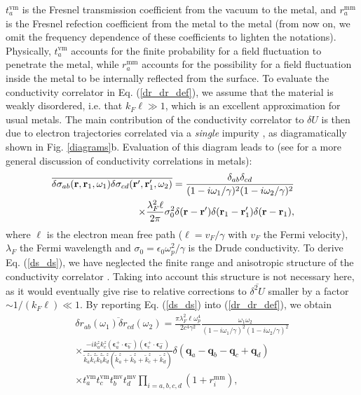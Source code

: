 \documentclass[doublecol]{epl2}
\newcommand{\bs}[1]{{\boldsymbol{#1}}}
\newcommand{\bq}{\bs{q}}
\newcommand{\be}{\bs{\epsilon}}
\begin{document}
$t_a^\text{vm}$ is the Fresnel transmission coefficient from the vacuum to the metal, and $r_a^\text{mm}$ is the Fresnel refection coefficient from the metal to the metal (from now on, we omit the frequency dependence of these coefficients to lighten the notations). Physically, $t_a^\text{vm}$ accounts for the finite probability for a field fluctuation to penetrate the metal, while $r_a^\text{mm}$ accounts for the possibility for a field fluctuation inside the metal to be internally reflected from the surface. 
To evaluate  the conductivity correlator in Eq. (\ref{dr_dr_def}), we assume that the material is weakly disordered, i.e. that $k_F\ell\gg 1$, which is an excellent approximation for usual metals. The main contribution of the conductivity correlator to $\delta U$ is then due to electron trajectories correlated via a \textit{single} impurity \cite{Cherroret15}, as diagramatically shown in Fig. \ref{diagrams}b. Evaluation of this diagram leads to (see \cite{Kane88} for a more general discussion of conductivity correlations in metals):
\begin{eqnarray}
&&\hspace{-1cm}
\overline{\delta \sigma_{ab}(\textbf{r},\textbf{r}_1,\omega_1)\delta \sigma_{cd}(\textbf{r}',\textbf{r}_1',\omega_2)}= 
\dfrac{\delta_{ab}\delta_{cd}}{(1-i\omega_1/\gamma)^2(1-i\omega_2/\gamma)^2}\nonumber\\ 
&&\times\frac{\lambda_F^2\ell}{2\pi}\sigma_0^2
\delta(\textbf{r}-\textbf{r}')\delta(\textbf{r}_1-\textbf{r}_1')\delta(\textbf{r}-\textbf{r}_1),
\label{ds_ds}
\end{eqnarray}
where $\ell$ is the electron mean free path ($\ell=v_F/\gamma$ with $v_F$ the Fermi velocity), $\lambda_F$ the Fermi wavelength and $\sigma_0=\epsilon_0\omega_p^2/\gamma$ is the Drude conductivity. To derive Eq. (\ref{ds_ds}), we have neglected the finite range and anisotropic structure of the conductivity correlator \cite{Kane88}. Taking into account this structure is not necessary here, as it would eventually give rise to relative corrections to $\overline{\delta^2 U}$ smaller by a factor $\sim 1/(k_F\ell)\ll 1$.
By reporting Eq. (\ref{ds_ds}) into (\ref{dr_dr_def}), we obtain
\begin{equation}
\begin{split}
\overline{\delta r_{ab}(\omega_1)\delta r_{cd}(\omega_2)}=
\frac{\pi \lambda_F^2\ell\omega_p^4}{2 c^4\gamma^2}
\frac{\omega_1\omega_2}{(1-i\omega_1/\gamma)^2(1-i\omega_2/\gamma)^2}\\
\times\frac{-ik_a^zk_c^z (\be_a^+\!\cdot\!\be_b^-)(\be_c^+\!\cdot\!\be_d^-)}{\tilde{k}_a^z\tilde{k}_c^z\tilde{k}_b^z\tilde{k}_d^z(\tilde{k}_a^z +\tilde{k}_b^z+\tilde{k}_c^{z}+\tilde{k}_d^{z})}
\delta(\bq_a\!-\!\bq_b\!-\!\bq_c\!+\!\bq_d)
\\\times t_a^\text{vm}t_c^\text{vm}
t_b^\text{mv}t_d^\text{mv}
\prod_{i=a,b,c,d}(1+r_i^\text{mm}),
\label{dr_dr}
\end{split}
\end{equation}
\end{document}
